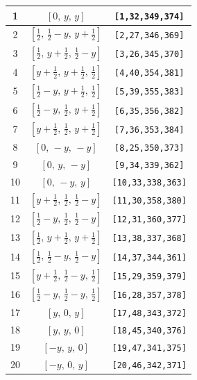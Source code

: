 \documentclass[fleqn,8pt]{jsarticle}
\begin{document}
\begin{longtable}{ccc}
1 & $\left[ 0,\, y,\, y \right]$ & {\tt [1,32,349,374]} \\ \hline
2 & $\left[ \frac{1}{2},\, \frac{1}{2} - y,\, y + \frac{1}{2} \right]$ & {\tt [2,27,346,369]} \\ \hline
3 & $\left[ \frac{1}{2},\, y + \frac{1}{2},\, \frac{1}{2} - y \right]$ & {\tt [3,26,345,370]} \\ \hline
4 & $\left[ y + \frac{1}{2},\, y + \frac{1}{2},\, \frac{1}{2} \right]$ & {\tt [4,40,354,381]} \\ \hline
5 & $\left[ \frac{1}{2} - y,\, y + \frac{1}{2},\, \frac{1}{2} \right]$ & {\tt [5,39,355,383]} \\ \hline
6 & $\left[ \frac{1}{2} - y,\, \frac{1}{2},\, y + \frac{1}{2} \right]$ & {\tt [6,35,356,382]} \\ \hline
7 & $\left[ y + \frac{1}{2},\, \frac{1}{2},\, y + \frac{1}{2} \right]$ & {\tt [7,36,353,384]} \\ \hline
8 & $\left[ 0,\, - y,\, - y \right]$ & {\tt [8,25,350,373]} \\ \hline
9 & $\left[ 0,\, y,\, - y \right]$ & {\tt [9,34,339,362]} \\ \hline
10 & $\left[ 0,\, - y,\, y \right]$ & {\tt [10,33,338,363]} \\ \hline
11 & $\left[ y + \frac{1}{2},\, \frac{1}{2},\, \frac{1}{2} - y \right]$ & {\tt [11,30,358,380]} \\ \hline
12 & $\left[ \frac{1}{2} - y,\, \frac{1}{2},\, \frac{1}{2} - y \right]$ & {\tt [12,31,360,377]} \\ \hline
13 & $\left[ \frac{1}{2},\, y + \frac{1}{2},\, y + \frac{1}{2} \right]$ & {\tt [13,38,337,368]} \\ \hline
14 & $\left[ \frac{1}{2},\, \frac{1}{2} - y,\, \frac{1}{2} - y \right]$ & {\tt [14,37,344,361]} \\ \hline
15 & $\left[ y + \frac{1}{2},\, \frac{1}{2} - y,\, \frac{1}{2} \right]$ & {\tt [15,29,359,379]} \\ \hline
16 & $\left[ \frac{1}{2} - y,\, \frac{1}{2} - y,\, \frac{1}{2} \right]$ & {\tt [16,28,357,378]} \\ \hline
17 & $\left[ y,\, 0,\, y \right]$ & {\tt [17,48,343,372]} \\ \hline
18 & $\left[ y,\, y,\, 0 \right]$ & {\tt [18,45,340,376]} \\ \hline
19 & $\left[ - y,\, y,\, 0 \right]$ & {\tt [19,47,341,375]} \\ \hline
20 & $\left[ - y,\, 0,\, y \right]$ & {\tt [20,46,342,371]} \\ \hline

\end{longtable}
\end{document}
